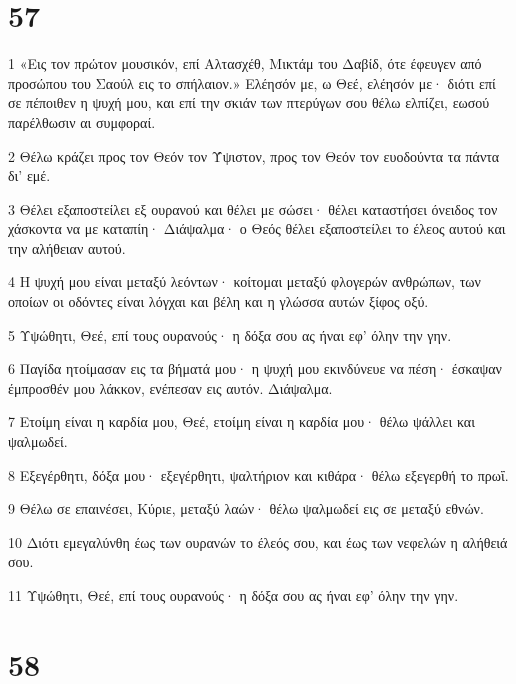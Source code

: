 \chapter{57}

\par 1 «Εις τον πρώτον μουσικόν, επί Αλτασχέθ, Μικτάμ του Δαβίδ, ότε έφευγεν από προσώπου του Σαούλ εις το σπήλαιον.» Ελέησόν με, ω Θεέ, ελέησόν με· διότι επί σε πέποιθεν η ψυχή μου, και επί την σκιάν των πτερύγων σου θέλω ελπίζει, εωσού παρέλθωσιν αι συμφοραί.
\par 2 Θέλω κράζει προς τον Θεόν τον Ύψιστον, προς τον Θεόν τον ευοδούντα τα πάντα δι' εμέ.
\par 3 Θέλει εξαποστείλει εξ ουρανού και θέλει με σώσει· θέλει καταστήσει όνειδος τον χάσκοντα να με καταπίη· Διάψαλμα· ο Θεός θέλει εξαποστείλει το έλεος αυτού και την αλήθειαν αυτού.
\par 4 Η ψυχή μου είναι μεταξύ λεόντων· κοίτομαι μεταξύ φλογερών ανθρώπων, των οποίων οι οδόντες είναι λόγχαι και βέλη και η γλώσσα αυτών ξίφος οξύ.
\par 5 Υψώθητι, Θεέ, επί τους ουρανούς· η δόξα σου ας ήναι εφ' όλην την γην.
\par 6 Παγίδα ητοίμασαν εις τα βήματά μου· η ψυχή μου εκινδύνευε να πέση· έσκαψαν έμπροσθέν μου λάκκον, ενέπεσαν εις αυτόν. Διάψαλμα.
\par 7 Ετοίμη είναι η καρδία μου, Θεέ, ετοίμη είναι η καρδία μου· θέλω ψάλλει και ψαλμωδεί.
\par 8 Εξεγέρθητι, δόξα μου· εξεγέρθητι, ψαλτήριον και κιθάρα· θέλω εξεγερθή το πρωΐ.
\par 9 Θέλω σε επαινέσει, Κύριε, μεταξύ λαών· θέλω ψαλμωδεί εις σε μεταξύ εθνών.
\par 10 Διότι εμεγαλύνθη έως των ουρανών το έλεός σου, και έως των νεφελών η αλήθειά σου.
\par 11 Υψώθητι, Θεέ, επί τους ουρανούς· η δόξα σου ας ήναι εφ' όλην την γην.

\chapter{58}

